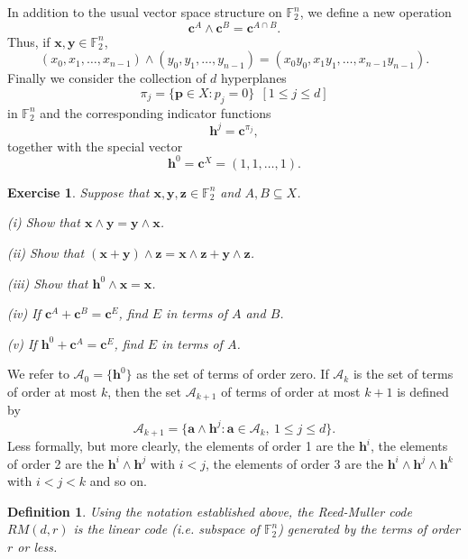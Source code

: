 \documentclass[12pt,a4paper]{article}
\theoremstyle{plain}
\newtheorem{definition}[theorem]{Definition}
\newtheorem{exercise}[theorem]{Exercise}
\theoremstyle{definition}
\begin{document}
    In addition to
    the usual vector space structure on ${\mathbb F}_{2}^{n}$,
    we define a new operation
    \[{\mathbf c}^{A}\wedge{\mathbf c}^{B}
    ={\mathbf c}^{A\cap B}.\]
    Thus, if ${\mathbf x},{\mathbf y}\in {\mathbb F}_{2}^{n}$,
    \[(x_{0},x_{1},\dots,x_{n-1})\wedge(y_{0},y_{1},\dots,y_{n-1})
    =(x_{0}y_{0},x_{1}y_{1},\dots,x_{n-1}y_{n-1}).\]
    Finally we consider the collection of $d$ hyperplanes
    \[\pi_{j}=\{{\mathbf p}\in X:p_{j}=0\}\ \  [1\leq j\leq d]\]
    in ${\mathbb F}_{2}^{n}$
    and the corresponding indicator functions
    \[{\mathbf h}^{j}={\mathbf c}^{\pi_{j}},\]
    together with the special vector
    \[{\mathbf h}^{0}={\mathbf c}^{X}=(1,1,\dots,1).\]
    \begin{exercise}
        Suppose that
        ${\mathbf x},{\mathbf y},{\mathbf z}\in {\mathbb F}_{2}^{n}$
        and $A,B\subseteq X$.

        (i) Show that
        ${\mathbf x}\wedge{\mathbf y}={\mathbf y}\wedge{\mathbf x}$.

        (ii) Show that
        $({\mathbf x}+{\mathbf y})\wedge{\mathbf z}
        ={\mathbf x}\wedge{\mathbf z}+{\mathbf y}\wedge{\mathbf z}$.

        (iii) Show that ${\mathbf h}^{0}\wedge{\mathbf x}={\mathbf x}$.

        (iv) If ${\mathbf c}^{A}+{\mathbf c}^{B}={\mathbf c}^{E}$,
        find $E$ in terms of $A$ and $B$.

        (v) If ${\mathbf h}^{0}+{\mathbf c}^{A}={\mathbf c}^{E}$,
        find $E$ in terms of $A$.
    \end{exercise}

    We refer to ${\mathcal A}_{0}=\{{\mathbf h}^{0}\}$ as the
    set of terms of order zero.
    If ${\mathcal A}_{k}$ is the set of terms of order at most $k$,
    then the set ${\mathcal A}_{k+1}$ of terms of order at most $k+1$
    is defined by
    \[{\mathcal A}_{k+1}=\{{\mathbf a}\wedge{\mathbf h}^{j}:
    {\mathbf a}\in {\mathcal A}_{k},\ 1\leq j\leq d\}.\]
    Less formally, but more clearly, the elements
    of order 1 are the ${\mathbf h}^{i}$, the elements
    of order 2 are the ${\mathbf h}^{i}\wedge{\mathbf h}^{j} $
    with $i<j$, the elements
    of order 3 are the
    ${\mathbf h}^{i}\wedge{\mathbf h}^{j}\wedge{\mathbf h}^{k}$
    with $i<j<k$ and so on.
    \begin{definition}
        Using the notation established
        above, the Reed-Muller code  $RM(d,r)$ is the linear code
        (i.e. subspace of ${\mathbb F}_{2}^{n}$) generated
        by the terms of order $r$ or less.
    \end{definition}
\end{document}
